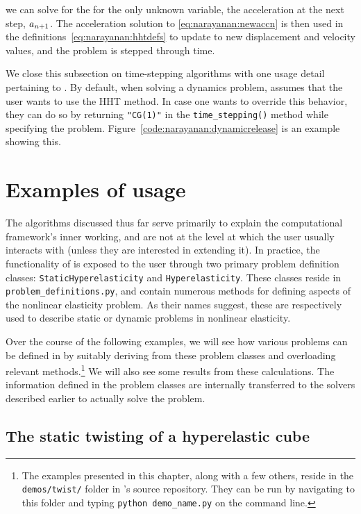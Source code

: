 \noindent we can solve for the for the only unknown variable, the
acceleration at the next step, $\mbox{$ a$}_{n+1}$. The acceleration solution
to \eqref{eq:narayanan:newaccn} is then used in the
definitions~\eqref{eq:narayanan:hhtdefs} to update to new displacement
and velocity values, and the problem is stepped through time.

We close this subsection on time-stepping algorithms with one usage
detail pertaining to \twist. By default, when solving a dynamics
problem, \twist{} assumes that the user wants to use the HHT
method. In case one wants to override this behavior, they can do so
by returning {\tt "CG(1)"} in the {\tt time\_stepping()} method while
specifying the problem. Figure~\ref{code:narayanan:dynamicrelease} is
an example showing this.

\section{Examples of \twist{} usage}

The algorithms discussed thus far serve primarily to explain the
computational framework's inner working, and are not at the level at
which the user usually interacts with \twist{} (unless they are
interested in extending it). In practice, the functionality of \twist{}
is exposed to the user through two primary problem definition classes:
{\tt StaticHyperelasticity} and {\tt Hyperelasticity}. These classes
reside in {\tt problem\_definitions.py}, and contain numerous methods
for defining aspects of the nonlinear elasticity problem. As their
names suggest, these are respectively used to describe static or
dynamic problems in nonlinear elasticity.

Over the course of the following examples, we will see how various
problems can be defined in \twist{} by suitably deriving from these
problem classes and overloading relevant methods.\footnote{The
examples presented in this chapter, along with a few others, reside in
the {\tt demos/twist/} folder in \twist's source repository. They can
be run by navigating to this folder and typing {\tt python
demo\_name.py} on the command line.} We will also see some results
from these calculations. The information defined in the problem
classes are internally transferred to the solvers described earlier to
actually solve the problem.

\subsection{The static twisting of a hyperelastic cube}

